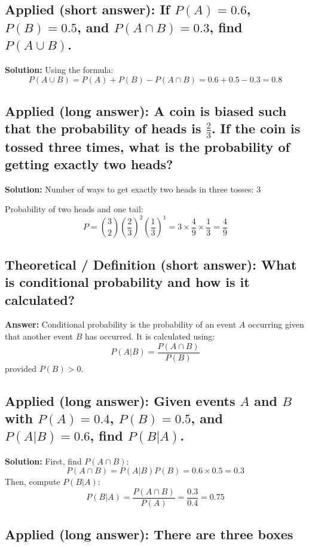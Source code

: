 \documentclass[12pt]{article}
\begin{document}
\subsection{Applied (short answer): If \( P(A) = 0.6 \), \( P(B) = 0.5 \), and \( P(A \cap B) = 0.3 \), find \( P(A \cup B) \).}

\textbf{Solution:}
Using the formula:
\[
P(A \cup B) = P(A) + P(B) - P(A \cap B) = 0.6 + 0.5 - 0.3 = 0.8
\]

\subsection{Applied (long answer): A coin is biased such that the probability of heads is \( \frac{2}{3} \). If the coin is tossed three times, what is the probability of getting exactly two heads?}

\textbf{Solution:}
Number of ways to get exactly two heads in three tosses: 3

Probability of two heads and one tail:
\[
P = \binom{3}{2} \left( \frac{2}{3} \right)^2 \left( \frac{1}{3} \right)^1 = 3 \times \frac{4}{9} \times \frac{1}{3} = \frac{4}{9}
\]

\subsection{Theoretical / Definition (short answer): What is conditional probability and how is it calculated?}

\textbf{Answer:} Conditional probability is the probability of an event \( A \) occurring given that another event \( B \) has occurred. It is calculated using:
\[
P(A | B) = \frac{P(A \cap B)}{P(B)}
\]
provided \( P(B) > 0 \).

\subsection{Applied (long answer): Given events \( A \) and \( B \) with \( P(A) = 0.4 \), \( P(B) = 0.5 \), and \( P(A | B) = 0.6 \), find \( P(B | A) \).}

\textbf{Solution:}
First, find \( P(A \cap B) \):
\[
P(A \cap B) = P(A | B) P(B) = 0.6 \times 0.5 = 0.3
\]
Then, compute \( P(B | A) \):
\[
P(B | A) = \frac{P(A \cap B)}{P(A)} = \frac{0.3}{0.4} = 0.75
\]

\subsection{Applied (long answer): There are three boxes}
\end{document}
